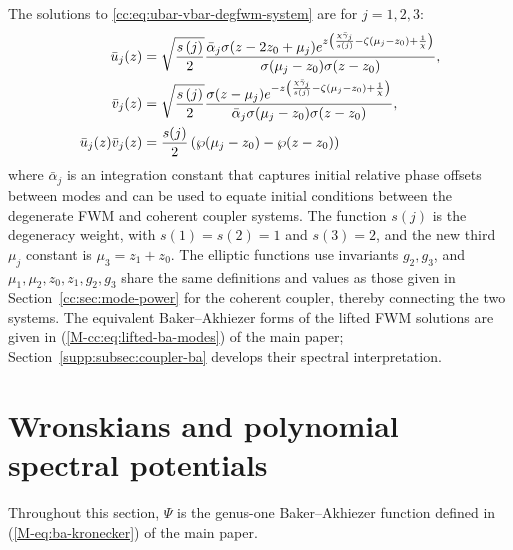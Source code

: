 \documentclass[11pt,a4paper]{article}
\newcommand{\externaleqref}[1]{\textup{(\ref*{#1})}}
\begin{document}
The solutions to \eqref{cc:eq:ubar-vbar-degfwm-system} are for $j=1,2,3$:
\begin{align}
\bar{u}_j{\left(z\right)} &= \sqrt{\frac{s\left(j\right)}{2}}\frac{{\bar{\alpha}}_{j}\sigma{\left(z - 2 z_{0} + {\mu}_{j}\right)} e^{z \left(\frac{\chi {\bar{\gamma}}_{j}}{s{\left(j \right)}} - \zeta{\left({\mu}_{j} - z_{0}\right)} + \frac{1}{\chi}\right)}}{\sigma{\left({\mu}_{j} - z_{0}\right)} \sigma{\left(z - z_{0}\right)  }}, \notag \\
\bar{v}_j{\left(z\right)} &= \sqrt{\frac{s\left(j\right)}{2}}\frac{\sigma{\left(z - {\mu}_{j}\right)} e^{- z \left(\frac{\chi {\bar{\gamma}}_{j}}{s{\left(j \right)}} - \zeta{\left({\mu}_{j} - z_{0}\right)} + \frac{1}{\chi}\right)}}{{\bar{\alpha}}_{j} \sigma{\left({\mu}_{j} - z_{0}\right)} \sigma{\left(z - z_{0}\right)} }, \notag \\
\bar{u}_j{\left(z\right)} \bar{v}_j{\left(z\right)} &= \frac{s{\left(j \right)}}{2}\left(\wp{\left({\mu}_{j} - z_{0} \right)} - \wp{\left(z - z_{0}\right)}\right) \label{cc:eq:-ubar-vbar-sols-dfwm}
\end{align}
where $\bar{\alpha}_j$ is an integration constant that captures initial relative phase offsets between modes and can be used to equate initial conditions between the degenerate FWM and coherent coupler systems.
The function $s(j)$ is the degeneracy weight, with $s(1)=s(2)=1$ and $s(3)=2$, and the new third $\mu_j$ constant is $\mu_3 = z_1 + z_0$. The elliptic functions use invariants $g_2, g_3$, and $\mu_1, \mu_2, z_0, z_1, g_2, g_3$ share the same definitions and values as those given in Section~\ref{cc:sec:mode-power} for the coherent coupler, thereby connecting the two systems.
The equivalent Baker--Akhiezer forms of the lifted FWM solutions are given in \externaleqref{M-cc:eq:lifted-ba-modes} of the main paper; Section~\ref{supp:subsec:coupler-ba} develops their spectral interpretation.

\section{Wronskians and polynomial spectral potentials}\label{supp:sec:spectral}
Throughout this section, $\Psi$ is the genus-one Baker--Akhiezer function defined in \externaleqref{M-eq:ba-kronecker} of the main paper.
\end{document}
